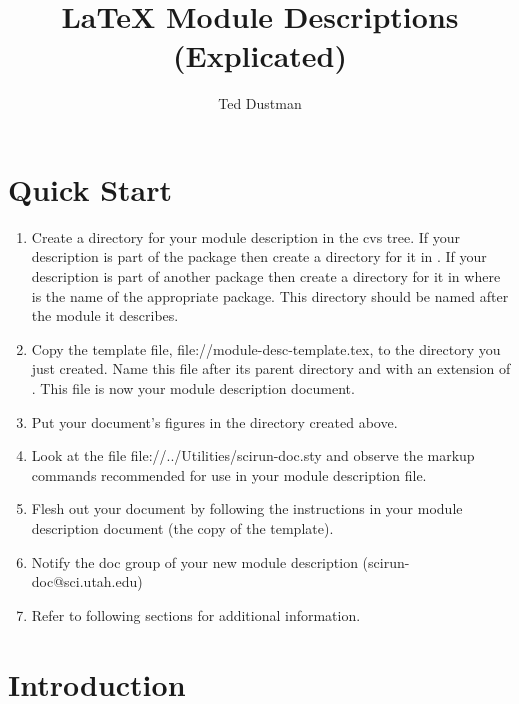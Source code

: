 \documentclass[11pt]{article}
\begin{document}
\begin{htmlonly}

\end{htmlonly}

\title{\LaTeX{} Module Descriptions (Explicated)}
\author{Ted Dustman}
\maketitle 
\newpage
\tableofcontents
\newpage


\section{Quick Start}

\begin{enumerate}
\item Create a directory for your module description in the cvs tree.  If your
  description is part of the \sr{} package then create a directory for it
  in .  If your description is part of another
  package then create a directory for it in
   where  is
  the name of the appropriate package.  This directory should be named
  after the module it describes.
\item Copy the template file, 
  {file://module-desc-template.tex}, to the directory you just created.
  Name this file after its parent directory and with an extension of
  . 
  This file is now your module description document.
\item Put your document's figures in the directory created above.
\item Look at the file 
  {file://../Utilities/scirun-doc.sty} and observe the markup
  commands recommended for use in your module description file.
\item Flesh out your document by following the instructions in your
  module description document (the copy of the template).
\item Notify the doc group of your new module description
  (scirun-doc@sci.utah.edu)
\item Refer to following sections for additional information.
\end{enumerate}

\section{Introduction}
\end{document}
